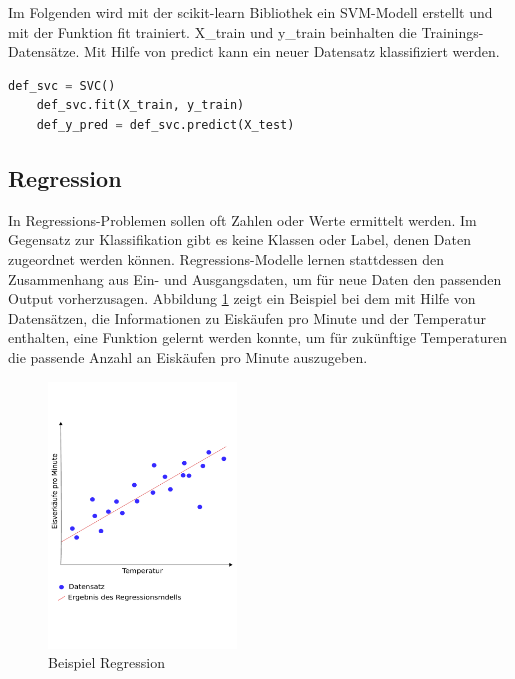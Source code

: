 	Im Folgenden wird mit der scikit-learn Bibliothek ein SVM-Modell erstellt und mit der Funktion fit trainiert. X\_train und y\_train beinhalten die Trainings-Datensätze. Mit Hilfe von predict kann ein neuer Datensatz klassifiziert werden.
	\lstset{style=code}
	\begin{lstlisting}[language=Python]
	def_svc = SVC()
	def_svc.fit(X_train, y_train)
	def_y_pred = def_svc.predict(X_test)
	\end{lstlisting}
	\cite{Sarkar2018}	
	 
	
	\subsection{Regression}
	In Regressions-Problemen sollen oft Zahlen oder Werte ermittelt werden. Im Gegensatz zur Klassifikation gibt es keine Klassen oder Label, denen Daten zugeordnet werden können. Regressions-Modelle lernen stattdessen den Zusammenhang aus Ein- und Ausgangsdaten, um für neue Daten den passenden Output vorherzusagen. \cite{Sarkar2018}
	 \newline
	Abbildung \ref{fig:abb2} zeigt ein Beispiel bei dem mit Hilfe von Datensätzen, die Informationen zu Eiskäufen pro Minute und der Temperatur enthalten, eine Funktion gelernt werden konnte, um für zukünftige Temperaturen die passende Anzahl an Eiskäufen pro Minute auszugeben. \cite{Sarkar2018}
	\newline
	
	\begin{figure}[H]
		\centering
		\includegraphics[width=5cm]{Bilder/Regression.pdf}
		\caption{Beispiel Regression}
		\label{fig:abb2}
	\end{figure}
	
